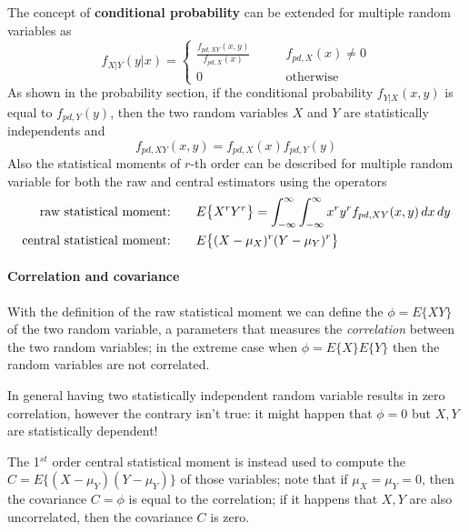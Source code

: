 		The concept of \textbf{conditional probability} can be extended for multiple random variables as
		\begin{equation}
			f_{X|Y}(y|x) = \begin{cases}
				\frac{f_{pd,XY}(x,y)}{f_{pd,X}(x)} \qquad & f_{pd,X}(x) \neq 0 \\
				0 & \textrm{otherwise}
			\end{cases}
		\end{equation}
		As shown in the probability section, if the conditional probability $f_{Y|X} (x,y)$ is equal to  $f_{pd,Y}(y)$, then the two random variables $X$ and $Y$ are statistically independents and
		\[ f_{pd,XY}(x,y) = f_{pd,X}(x) f_{pd,Y}(y) \]
		 Also the statistical moments of $r$-th order can be described for multiple random variable for both the raw and central estimators using the operators
		 \begin{equation}
		 \begin{aligned}
		 	\text{raw statistical moment:} \qquad & E\big\{ X^rY^r \big\} = \int_{-\infty}^\infty \int_{-\infty}^\infty x^r y^r f_{pd,XY}(x,y)\, dx \,dy \\
		 	\text{central statistical moment:} \qquad & E\big\{ (X-\mu_X)^r(Y-\mu_Y)^r \big\} 
		 \end{aligned}
		 \end{equation}
		
		\paragraph{Correlation and covariance}	With the definition of the raw statistical moment we can define the  $\phi = E\{XY\}$ of the two random variable, a parameters that measures the \textit{correlation} between the two random variables; in the extreme case when $\phi = E\{X\} E\{Y\}$ then the random variables are not correlated.
		\begin{note}
			In general having two statistically independent random variable results in zero correlation, however the contrary isn't true: it might happen that $\phi = 0$ but $X,Y$ are statistically dependent!
		\end{note}
		The 1$^{st}$ order central statistical moment is instead used to compute the  $C = E\{ (X-\mu_Y)(Y-\mu_Y) \}$ of those variables; note that if $\mu_X= \mu_Y = 0$, then the covariance $C=\phi$ is equal to the correlation; if it happens that $X,Y$ are also uncorrelated, then the covariance $C$ is zero.
		
